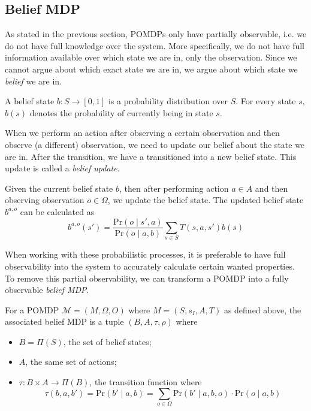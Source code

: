 \subsection{Belief MDP}
As stated in the previous section, POMDPs only have partially observable, i.e. we do not have full knowledge over the system. More specifically, we do not have full information available over which state we are in, only the observation. Since we cannot argue about which exact state we are in, we argue about which state we \textit{belief} we are in. 

\begin{definition}
A belief state $b:S\to [0,1]$ is a probability distribution over $S$. For every state $s$, $b(s)$ denotes the probability of currently being in state $s$.
\end{definition}

When we perform an action after observing a certain observation and then observe (a different) observation, we need to update our belief about the state we are in.  After the transition, we have a transitioned into a new belief state. This update is called a \textit{belief update}. 

\begin{definition}
Given the current belief state $b$, then after performing action $a\in A$ and then observing observation $o\in\Omega$, we update the belief state. The updated belief state $b^{a,o}$ can be calculated as
\[b^{a,o}(s')= \frac{\text{Pr}(o\mid s',a)}{\text{Pr}(o\mid a,b)}\sum\limits_{s\in S}T(s,a,s')b(s)\]
\end{definition}

When working with these probabilistic processes, it is preferable to have full observability into the system to accurately calculate certain wanted properties. To remove this partial observability, we can transform a POMDP into a fully observable \textit{belief MDP}. 

\begin{definition}
For a POMDP $\mathcal{M}=(M,\Omega,O)$ where $M=(S,s_I,A,T)$ as defined above, the associated belief MDP is a tuple $(B,A,\tau,\rho)$ where 
\begin{itemize}
\item $B=\Pi(S)$, the set of belief states;
\item $A$, the same set of actions;
\item $\tau:B\times A\to \Pi(B)$, the transition function where 
\[\tau(b,a,b')= \text{Pr}(b'\mid a,b)=\sum\limits_{o\in\Omega}\text{Pr}(b'\mid a,b,o)\cdot \text{Pr}(o\mid a,b)\]
\end{itemize}
\end{definition}

